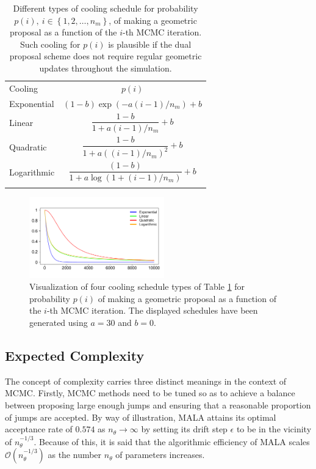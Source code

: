 \documentclass[twoside,11pt]{article}
\begin{document}
\begin{table}[t]
\centering
\begin{tabular}{l|c}
\hline\noalign{\smallskip}
Cooling & $p(i)$\\
\noalign{\smallskip}\hline\noalign{\smallskip}
Exponential & $(1-b)\exp(-a(i-1)/n_m)+b$\\
\noalign{\smallskip}\hline\noalign{\smallskip}
Linear & $\dfrac{1-b}{1+a(i-1)/n_m}+b$\\
\noalign{\smallskip}\hline\noalign{\smallskip}
Quadratic & $\dfrac{1-b}{1+a((i-1)/n_m)^2}+b$\\
\noalign{\smallskip}\hline\noalign{\smallskip}
Logarithmic & $\dfrac{(1-b)}{1+a\log(1+(i-1)/n_m)}+b$\\
\noalign{\smallskip}\hline
\end{tabular}
\caption{
Different types of cooling schedule for probability $p(i),~i\in\left\{1,2,\dots,n_m\right\}$, of making a geometric proposal 
as a function of the $i$-th MCMC iteration. Such cooling for $p(i)$ is plausible if the dual proposal scheme does not 
require regular geometric updates throughout the simulation.
}
\label{tab:cooling_schedules}
\end{table}

\begin{figure}[t]
\centering
\includegraphics[width=2.3in]{cooling_schedules.pdf}
\caption{
Visualization of four cooling schedule types of Table \ref{tab:cooling_schedules} for probability $p(i)$ of making a 
geometric proposal as a function of the $i$-th MCMC iteration. The displayed schedules have been generated using $a=30$ and 
$b=0$.
}
\label{fig:cooling_schedules}
\end{figure}

\subsection{Expected Complexity}
\label{Expected Complexity}

The concept of complexity carries three distinct meanings in the context of MCMC. Firstly, MCMC methods need to be tuned so
as to achieve a balance between proposing large enough jumps and ensuring that a reasonable proportion of jumps are accepted.
By way of illustration, MALA attains its optimal acceptance rate of $0.574$ as $n_{\theta}\rightarrow\infty$ by setting its
drift step $\epsilon$ to be in the vicinity of $n_{\theta}^{-1/3}$. Because of this, it is said that the algorithmic
efficiency of MALA scales $\mathcal{O}(n_{\theta}^{-1/3})$ as the number $n_{\theta}$ of parameters increases.
\end{document}
